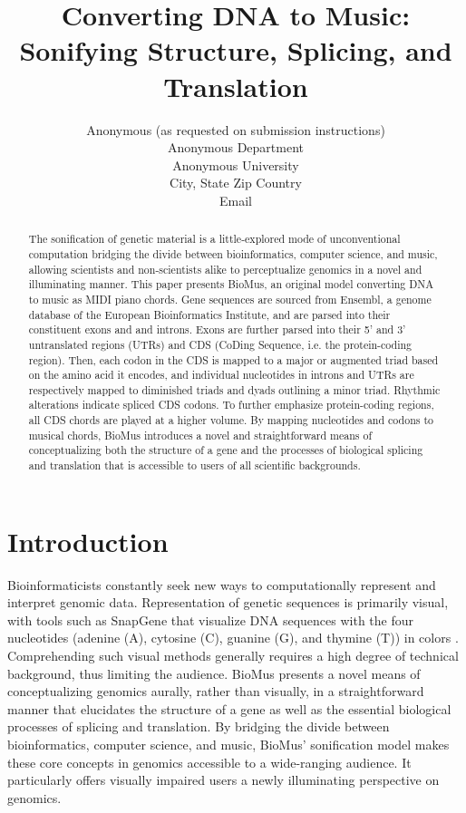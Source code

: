 \documentclass[letterpaper]{article}
\title{Converting DNA to Music: Sonifying Structure, Splicing, and Translation}
\author{Anonymous (as requested on submission instructions)\\
Anonymous Department\\
Anonymous University\\
City, State Zip Country\\
Email\\
}
\begin{document}
 
\maketitle
\begin{abstract}
The sonification of genetic material is a little-explored mode of unconventional computation bridging the divide between bioinformatics, computer science, and music, allowing scientists and non-scientists alike to perceptualize genomics in a novel and illuminating manner. This paper presents BioMus, an original model converting DNA to music as MIDI piano chords. Gene sequences are sourced from Ensembl, a genome database of the European Bioinformatics Institute, and are parsed into their constituent exons and and introns. Exons are further parsed into their 5’ and 3’ untranslated regions (UTRs) and CDS (CoDing Sequence, i.e. the protein-coding region). Then, each codon in the CDS is mapped to a major or augmented triad based on the amino acid it encodes, and individual nucleotides in introns and UTRs are respectively mapped to diminished triads and dyads outlining a minor triad. Rhythmic alterations indicate spliced CDS codons. To further emphasize protein-coding regions, all CDS chords are played at a higher volume. By mapping nucleotides and codons to musical chords, BioMus introduces a novel and straightforward means of conceptualizing both the structure of a gene and the processes of biological splicing and translation that is accessible to users of all scientific backgrounds.

\end{abstract}

\section{Introduction}
Bioinformaticists constantly seek new ways to computationally represent and interpret genomic data. Representation of genetic sequences is primarily visual, with tools such as SnapGene that visualize DNA sequences with the four nucleotides (adenine (A), cytosine (C), guanine (G), and thymine (T)) in colors \cite{goldstein_2023}.
Comprehending such visual methods generally requires a high degree of technical background, thus limiting the audience. BioMus presents a novel means of conceptualizing genomics aurally, rather than visually, in a straightforward manner that elucidates the structure of a gene as well as the essential biological processes of splicing and translation. By bridging the divide between bioinformatics, computer science, and music, BioMus’ sonification model makes these core concepts in genomics accessible to a wide-ranging audience. It particularly offers visually impaired users a newly illuminating perspective on genomics.
\end{document}
